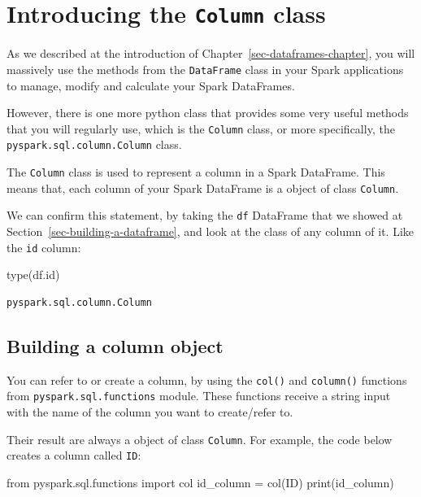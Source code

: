 \documentclass[
  11pt,
  letterpaper,
  DIV=11,
  numbers=noendperiod]{scrreprt}
\newenvironment{Shaded}{\begin{snugshade}}{\end{snugshade}}
\newcommand{\BuiltInTok}[1]{\textcolor[rgb]{0.00,0.23,0.31}{#1}}
\newcommand{\ImportTok}[1]{\textcolor[rgb]{0.00,0.46,0.62}{#1}}
\newcommand{\NormalTok}[1]{\textcolor[rgb]{0.00,0.23,0.31}{#1}}
\newcommand{\OperatorTok}[1]{\textcolor[rgb]{0.37,0.37,0.37}{#1}}
\newcommand{\StringTok}[1]{\textcolor[rgb]{0.13,0.47,0.30}{#1}}
\begin{document}

\chapter{\texorpdfstring{Introducing the \texttt{Column}
class}{Introducing the Column class}}\label{introducing-the-column-class}

As we described at the introduction of
Chapter~\ref{sec-dataframes-chapter}, you will massively use the methods
from the \texttt{DataFrame} class in your Spark applications to manage,
modify and calculate your Spark DataFrames.

However, there is one more python class that provides some very useful
methods that you will regularly use, which is the \texttt{Column} class,
or more specifically, the \texttt{pyspark.sql.column.Column} class.

The \texttt{Column} class is used to represent a column in a Spark
DataFrame. This means that, each column of your Spark DataFrame is a
object of class \texttt{Column}.

We can confirm this statement, by taking the \texttt{df} DataFrame that
we showed at Section~\ref{sec-building-a-dataframe}, and look at the
class of any column of it. Like the \texttt{id} column:

\begin{Shaded}
\begin{Highlighting}[]
\BuiltInTok{type}\NormalTok{(df.}\BuiltInTok{id}\NormalTok{)}
\end{Highlighting}
\end{Shaded}

\begin{verbatim}
pyspark.sql.column.Column
\end{verbatim}

\section{Building a column object}\label{building-a-column-object}

You can refer to or create a column, by using the \texttt{col()} and
\texttt{column()} functions from \texttt{pyspark.sql.functions} module.
These functions receive a string input with the name of the column you
want to create/refer to.

Their result are always a object of class \texttt{Column}. For example,
the code below creates a column called \texttt{ID}:

\begin{Shaded}
\begin{Highlighting}[]
\ImportTok{from}\NormalTok{ pyspark.sql.functions }\ImportTok{import}\NormalTok{ col}
\NormalTok{id\_column }\OperatorTok{=}\NormalTok{ col(}\StringTok{\textquotesingle{}ID\textquotesingle{}}\NormalTok{)}
\BuiltInTok{print}\NormalTok{(id\_column)}
\end{Highlighting}
\end{Shaded}
\end{document}
